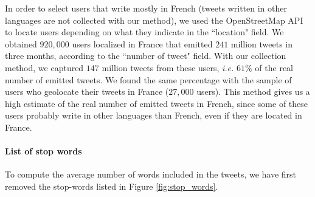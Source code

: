 In order to select users that write mostly in French (tweets written in other languages are not collected with our method), we used the OpenStreetMap API to locate users depending on what they indicate in the ``location" field. We obtained $920,000$ users localized in France that emitted $241$ million tweets in three months, according to the ``number of tweet" field. With our collection method, we captured $147$ million tweets from these users, \textit{i.e.} $61\%$ of the real number of emitted tweets. We found the same percentage with the sample of users who geolocate their tweets in France ($27,000$ users). This method gives us a high estimate of the real number of emitted tweets in French, since some of these users probably write in other languages than French, even if they are located in France.



\paragraph{List of stop words}

To compute the average number of words included in the tweets, we have first removed the stop-words listed in Figure \ref{fig:stop_words}.

